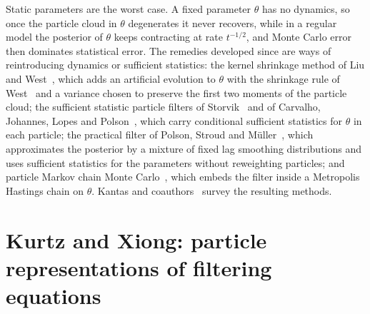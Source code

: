 Static parameters are the worst case. A fixed parameter $\theta$ has no dynamics, so once the particle cloud in $\theta$ degenerates it never recovers, while in a regular model the posterior of $\theta$ keeps contracting at rate $t^{-1/2}$, and Monte Carlo error then dominates statistical error. The remedies developed since are ways of reintroducing dynamics or sufficient statistics: the kernel shrinkage method of Liu and West~\cite{liuwest2001}, which adds an artificial evolution to $\theta$ with the shrinkage rule of West~\cite{west1993} and a variance chosen to preserve the first two moments of the particle cloud; the sufficient statistic particle filters of Storvik~\cite{storvik2002} and of Carvalho, Johannes, Lopes and Polson~\cite{cjlp2010}, which carry conditional sufficient statistics for $\theta$ in each particle; the practical filter of Polson, Stroud and M\"uller~\cite{psm2008}, which approximates the posterior by a mixture of fixed lag smoothing distributions and uses sufficient statistics for the parameters without reweighting particles; and particle Markov chain Monte Carlo~\cite{adh2010}, which embeds the filter inside a Metropolis Hastings chain on $\theta$. Kantas and coauthors~\cite{kantas2015} survey the resulting methods.



\section{Kurtz and Xiong: particle representations of filtering equations}
\label{sec:kurtz_xiong}


